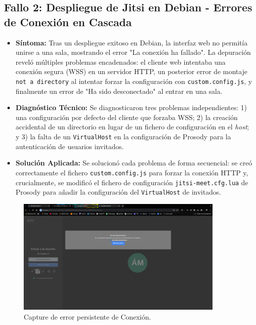 \subsection{Fallo 2: Despliegue de Jitsi en Debian - Errores de Conexión en Cascada}
\begin{itemize}
    \item \textbf{Síntoma:} Tras un despliegue exitoso en Debian, la interfaz web no permitía unirse a una sala, mostrando el error "La conexión ha fallado". La depuración reveló múltiples problemas encadenados: el cliente web intentaba una conexión segura (WSS) en un servidor HTTP, un posterior error de montaje \texttt{not a directory} al intentar forzar la configuración con \texttt{custom.config.js}, y finalmente un error de "Ha sido desconectado" al entrar en una sala.
    
    \item \textbf{Diagnóstico Técnico:} Se diagnosticaron tres problemas independientes: 1) una configuración por defecto del cliente que forzaba WSS; 2) la creación accidental de un directorio en lugar de un fichero de configuración en el \textit{host}; y 3) la falta de un \texttt{VirtualHost} en la configuración de Prosody para la autenticación de usuarios invitados.
    
    \item \textbf{Solución Aplicada:} Se solucionó cada problema de forma secuencial: se creó correctamente el fichero \texttt{custom.config.js} para forzar la conexión HTTP y, crucialmente, se modificó el fichero de configuración \texttt{jitsi-meet.cfg.lua} de Prosody para añadir la configuración del \texttt{VirtualHost} de invitados.
\end{itemize}

\begin{figure}[H]
    \centering
    \includegraphics[width=0.9\textwidth]{img/errorconexion.png}
    \caption{Capture de error persistente de Conexión.}
    \label{fig:anexod_error_conexion}
\end{figure}

